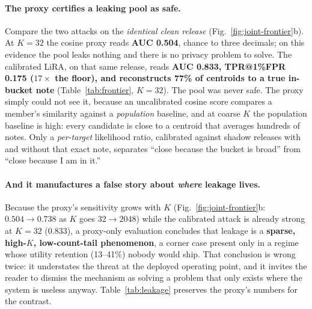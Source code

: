 \documentclass[pdflatex,sn-mathphys-num,12pt]{sn-jnl}
\theoremstyle{thmstyleone}%
\theoremstyle{thmstyletwo}%
\theoremstyle{thmstylethree}%
\begin{document}
\paragraph{The proxy certifies a leaking pool as safe.} Compare the two attacks on the
\emph{identical clean release} (Fig.~\ref{fig:joint-frontier}b). At $K = 32$ the cosine proxy
reads \textbf{AUC 0.504}, chance to three decimals; on this evidence the pool leaks
nothing and there is no privacy problem to solve. The calibrated LiRA, on that same
release, reads \textbf{AUC 0.833, TPR@1\%FPR 0.175 ($17\times$ the floor), and reconstructs
77\% of centroids to a true in-bucket note} (Table~\ref{tab:frontier}, $K = 32$). The pool was never safe. The proxy simply
could not see it, because an uncalibrated cosine score compares a member's similarity
against a \emph{population} baseline, and at coarse $K$ the population baseline is high:
every candidate is close to a centroid that averages hundreds of notes. Only a
\emph{per-target} likelihood ratio, calibrated against shadow releases with and without
that exact note, separates ``close because the bucket is broad'' from ``close because I
am in it.''

\paragraph{And it manufactures a false story about \emph{where} leakage lives.} Because the
proxy's sensitivity grows with $K$ (Fig.~\ref{fig:joint-frontier}b: $0.504 \to
0.738$ as $K$ goes $32 \to 2048$) while the calibrated attack is already strong at $K = 32$
($0.833$), a proxy-only evaluation concludes that leakage is a \textbf{sparse, high-$K$,
low-count-tail phenomenon}, a corner case present only in a regime whose utility
retention (13--41\%) nobody would ship. That conclusion is wrong twice: it understates the
threat at the deployed operating point, and it invites the reader to dismiss the mechanism
as solving a problem that only exists where the system is useless anyway.
Table~\ref{tab:leakage} preserves the proxy's numbers for the contrast.
\end{document}
